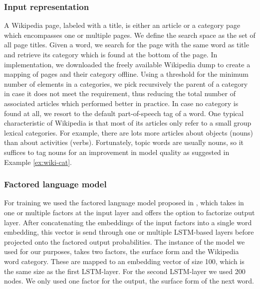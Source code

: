 \documentclass[a4paper]{article}
\begin{document}
\subsubsection{Input representation}
A Wikipedia page, labeled with a title, is either an article or a category page which encompasses one or multiple pages.
We define the search space as the set of all page titles. Given a word, we search for the page with the same word as title and retrieve its category which is found at the bottom of the page.
In implementation, we downloaded the freely available Wikipedia dump to create a mapping of pages and their category offline. Using a threshold for the minimum number of elements in a categories, we pick recursively the parent of a category in case it does not meet the requirement, thus reducing the total number of associated articles which performed better in practice. In case no category is found at all, we resort to the default part-of-speech tag of a word.
One typical characteristic of Wikipedia is that most of its articles only refer to a small group lexical categories. For example, there are lots more articles about objects (nouns) than about activities (verbs). Fortunately, topic words are usually nouns, so it suffices to tag nouns for an improvement in model quality as suggested in  Example \ref{ex:wiki-cat}.

\subsubsection{Factored language model}
For training we used the factored language model proposed in \cite{niehuesusing}, which takes in one or multiple factors at the input layer and offers the option to factorize output layer. After concatenating the embeddings of the input factors into a single word embedding, this vector is send through one or multiple LSTM-based layers before projected onto the factored output probabilities. The instance of the model we used for our purposes, takes two factors, the surface form and the Wikipedia word category. These are mapped to an embedding vector of size 100, which is the same size as the first LSTM-layer. For the second LSTM-layer we used 200 nodes. We only used one factor for the output, the surface form of the next word.
\end{document}
